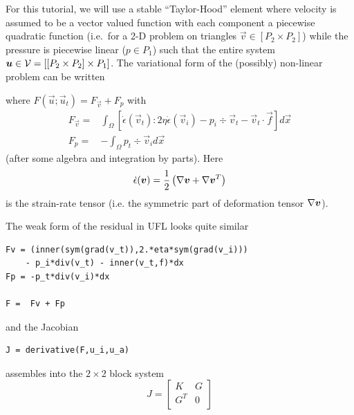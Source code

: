 For this tutorial, we will use a stable ``Taylor-Hood'' element where
velocity is assumed to be a vector valued function with each component
a piecewise quadratic function (i.e.\ for a 2-D problem on triangles
$\vec{v}\in [P_{2}\times P_{2}]$) while the pressure is piecewise
linear ($p\in P_{1}$) such that the entire system ${\mbox{\boldmath$u$}}\in \mathcal{V}
= [[P_{2}\times P_{2}]\times P_{1}]$.  The variational form of the
(possibly) non-linear problem can be written
\begin{quote}
\end{quote}
 where $F(\vec{u};\vec{u}_{t}) = F_{\vec{v}} + F_{p}$ with
\begin{align}
         F_{\vec{v}} =  & \int_\Omega \left[\dot{\epsilon}(\vec{v}_{t}):
             2\eta \dot{\epsilon}(\vec{v}_{i}) -
             p_{i}\div\vec{v}_t  - \vec{v}_{t} \cdot\vec{f} \right]d\vec{x}  \\
 F_{p} =& -\int_\Omega p_t\div\vec{v}_{i} d\vec{x}
\end{align}
(after some algebra and integration by parts). Here
\begin{equation}
  \label{eq:19}
  \dot{\epsilon}({\mbox{\boldmath$v$}}) = \frac{1}{2}
  \left(
\nabla{\mbox{\boldmath$v$}} + \nabla{\mbox{\boldmath$v$}}^{T}
  \right)
\end{equation} is the strain-rate tensor (i.e. the symmetric part of
deformation tensor $\nabla{\mbox{\boldmath$v$}}$).   

The weak form of the residual in UFL looks quite similar
\begin{lstlisting}[style=UFL]
Fv = (inner(sym(grad(v_t)),2.*eta*sym(grad(v_i)))
    - p_i*div(v_t) - inner(v_t,f)*dx  
Fp = -p_t*div(v_i)*dx 

F =  Fv + Fp 
\end{lstlisting}
and the Jacobian
\begin{lstlisting}[style=UFL]
  J = derivative(F,u_i,u_a)
\end{lstlisting}
assembles into the $2\times2$ block system
\begin{equation}
  \label{eq:20}
  J =
  \left[
    \begin{array}{cc}
      K & G \\
      G^{T} & 0\\
    \end{array}
  \right]
\end{equation}

